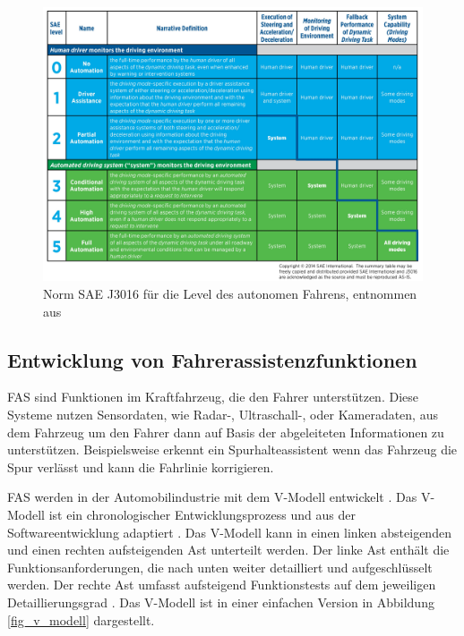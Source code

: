 \begin{figure}[h]
\centering
\includegraphics[scale=0.7]{images/level_autonomes_fahren.jpg}
\caption{Norm SAE J3016 für die Level des autonomen Fahrens, entnommen aus \cite{sae2014taxonomy}}
\label{fig_level_autonomes_fahren}
\end{figure}


\subsection{Entwicklung von Fahrerassistenzfunktionen}
\label{grundlagen_fahren_entwicklung}

\ac{FAS} sind Funktionen im Kraftfahrzeug, die den Fahrer unterstützen. Diese Systeme nutzen Sensordaten, wie Radar-, Ultraschall-, oder Kameradaten, aus dem Fahrzeug um den Fahrer dann auf Basis der abgeleiteten Informationen zu unterstützen. Beispielsweise erkennt ein Spurhalteassistent wenn das Fahrzeug die Spur verlässt und kann die Fahrlinie korrigieren. 

\ac{FAS} werden in der Automobilindustrie mit dem V-Modell entwickelt . Das V-Modell ist ein chronologischer Entwicklungsprozess und aus der Softwareentwicklung adaptiert \cite{vmodell2005}. Das V-Modell kann in einen linken absteigenden und einen rechten aufsteigenden Ast unterteilt werden. Der linke Ast enthält die Funktionsanforderungen, die nach unten weiter detailliert und aufgeschlüsselt werden. Der rechte Ast umfasst aufsteigend Funktionstests auf dem jeweiligen Detaillierungsgrad \cite{hakuli2015virtuelle}. Das V-Modell ist in einer einfachen Version in Abbildung \ref{fig_v_modell} dargestellt.

